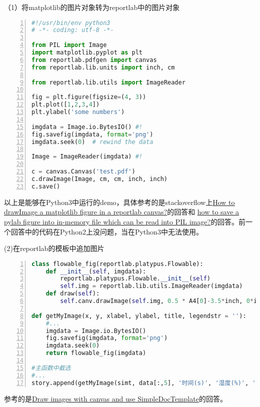 （1）将matplotlib的图片对象转为reportlab中的图片对象
\begin{lstlisting}[language=python,numbers=left,firstnumber = 1,breaklines = true,numberstyle=\tiny,keywordstyle=\color{blue!70},commentstyle=\color{red!50!green!50!blue!50},frame=shadowbox, rulesepcolor=\color{red!20!green!20!blue!20}]
#!/usr/bin/env python3
# -*- coding: utf-8 -*-

from PIL import Image
import matplotlib.pyplot as plt
from reportlab.pdfgen import canvas
from reportlab.lib.units import inch, cm

from reportlab.lib.utils import ImageReader

fig = plt.figure(figsize=(4, 3))
plt.plot([1,2,3,4])
plt.ylabel('some numbers')

imgdata = Image.io.BytesIO() #!
fig.savefig(imgdata, format='png')
imgdata.seek(0)  # rewind the data

Image = ImageReader(imgdata) #!

c = canvas.Canvas('test.pdf')
c.drawImage(Image, cm, cm, inch, inch)
c.save()
\end{lstlisting}
以上是能够在Python3中运行的demo，具体参考的是stackoverflow上\href{https://stackoverflow.com/questions/18897511/how-to-drawimage-a-matplotlib-figure-in-a-reportlab-canvas}{How to drawImage a matplotlib figure in a reportlab canvas?}的回答和
\href{https://stackoverflow.com/questions/8598673/how-to-save-a-pylab-figure-into-in-memory-file-which-can-be-read-into-pil-image}{how to save a pylab figure into in-memory file which can be read into PIL image?}的回答。前一个回答中的代码在Python2上没问题，当在Python3中无法使用。

(2)在reportlab的模板中追加图片
\begin{lstlisting}[language=python,numbers=left,firstnumber = 1,breaklines = true,numberstyle=\tiny,keywordstyle=\color{blue!70},commentstyle=\color{red!50!green!50!blue!50},frame=shadowbox, rulesepcolor=\color{red!20!green!20!blue!20}]
class flowable_fig(reportlab.platypus.Flowable):
    def __init__(self, imgdata):
        reportlab.platypus.Flowable.__init__(self)
        self.img = reportlab.lib.utils.ImageReader(imgdata)
    def draw(self):
        self.canv.drawImage(self.img, 0.5 * A4[0]-3.5*inch, 0*inch, height = -3*inch, width = 5*inch)

def getMyImage(x, y, xlabel, ylabel, title, legendstr = ''):
    #...
    imgdata = Image.io.BytesIO()
    fig.savefig(imgdata, format='png')
    imgdata.seek(0)  
    return flowable_fig(imgdata)

#主函数中截选
#...
story.append(getMyImage(simt, data[:,5], '时间(s)', '湿度(%)', '湿度曲线'))
\end{lstlisting}
参考的是\href{https://stackoverflow.com/questions/5356413/draw-images-with-canvas-and-use-simpledoctemplate}{Draw images with canvas and use SimpleDocTemplate}的回答。

